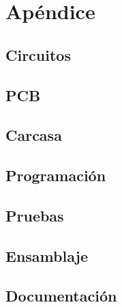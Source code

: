 \chapter{Apéndice}
\section{Circuitos}
\section{\gls{PCB}}
\section{Carcasa}
\section{Programación}
\section{Pruebas}
\section{Ensamblaje}
\section{Documentación}